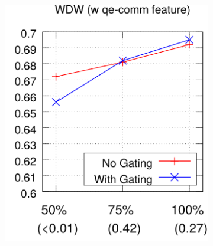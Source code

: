 \documentclass[11pt,a4paper]{article}
\begin{document}
\begin{figure}[ht]
\begin{subfigure}[b]{0.245\textwidth}
        \label{fig:wdw_wo_f}
    \end{subfigure}
    \begin{subfigure}[b]{0.245\textwidth}
        \includegraphics[width=1.0\linewidth]{figures/wdw-feat1-crop}
        \label{fig:wdw_w_f}
    \end{subfigure}
    \label{fig:ablation}
\end{figure}
\end{document}
